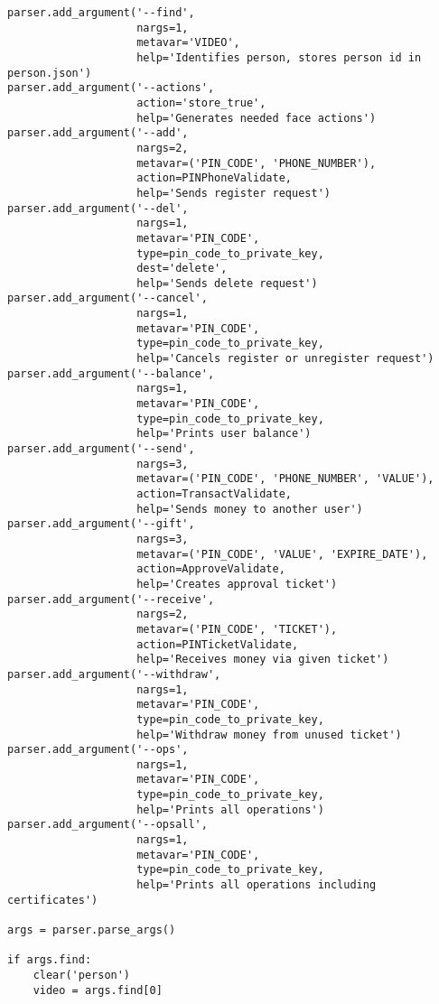 \begin{verbatim}
parser.add_argument('--find',
                    nargs=1,
                    metavar='VIDEO',
                    help='Identifies person, stores person id in person.json')
parser.add_argument('--actions',
                    action='store_true',
                    help='Generates needed face actions')
parser.add_argument('--add',
                    nargs=2,
                    metavar=('PIN_CODE', 'PHONE_NUMBER'),
                    action=PINPhoneValidate,
                    help='Sends register request')
parser.add_argument('--del',
                    nargs=1,
                    metavar='PIN_CODE',
                    type=pin_code_to_private_key,
                    dest='delete',
                    help='Sends delete request')
parser.add_argument('--cancel',
                    nargs=1,
                    metavar='PIN_CODE',
                    type=pin_code_to_private_key,
                    help='Cancels register or unregister request')
parser.add_argument('--balance',
                    nargs=1,
                    metavar='PIN_CODE',
                    type=pin_code_to_private_key,
                    help='Prints user balance')
parser.add_argument('--send',
                    nargs=3,
                    metavar=('PIN_CODE', 'PHONE_NUMBER', 'VALUE'),
                    action=TransactValidate,
                    help='Sends money to another user')
parser.add_argument('--gift',
                    nargs=3,
                    metavar=('PIN_CODE', 'VALUE', 'EXPIRE_DATE'),
                    action=ApproveValidate,
                    help='Creates approval ticket')
parser.add_argument('--receive',
                    nargs=2,
                    metavar=('PIN_CODE', 'TICKET'),
                    action=PINTicketValidate,
                    help='Receives money via given ticket')
parser.add_argument('--withdraw',
                    nargs=1,
                    metavar='PIN_CODE',
                    type=pin_code_to_private_key,
                    help='Withdraw money from unused ticket')
parser.add_argument('--ops',
                    nargs=1,
                    metavar='PIN_CODE',
                    type=pin_code_to_private_key,
                    help='Prints all operations')
parser.add_argument('--opsall',
                    nargs=1,
                    metavar='PIN_CODE',
                    type=pin_code_to_private_key,
                    help='Prints all operations including certificates')

args = parser.parse_args()

if args.find:
    clear('person')
    video = args.find[0]


\end{verbatim}

